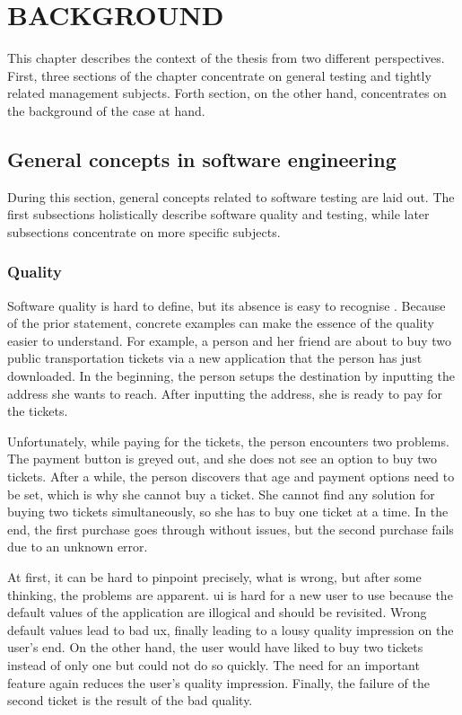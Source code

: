 \chapter{BACKGROUND}\label{chapter:background}
This chapter describes the context of the thesis from two different perspectives. First, three sections of the chapter concentrate on general testing and tightly related management subjects. Forth section, on the other hand, concentrates on the background of the case at hand.

\section{General concepts in software engineering}
During this section, general concepts related to software testing are laid out. The first subsections holistically describe software quality and testing, while later subsections concentrate on more specific subjects.

\subsection{Quality}
Software quality is hard to define, but its absence is easy to recognise \cite{kitchenham1989software,gillies2011software}. Because of the prior statement, concrete examples can make the essence of the quality easier to understand. For example, a person and her friend are about to buy two public transportation tickets via a new application that the person has just downloaded. In the beginning, the person setups the destination by inputting the address she wants to reach. After inputting the address, she is ready to pay for the tickets.

Unfortunately, while paying for the tickets, the person encounters two problems. The payment button is greyed out, and she does not see an option to buy two tickets. After a while, the person discovers that age and payment options need to be set, which is why she cannot buy a ticket. She cannot find any solution for buying two tickets simultaneously, so she has to buy one ticket at a time. In the end, the first purchase goes through without issues, but the second purchase fails due to an unknown error.

At first, it can be hard to pinpoint precisely, what is wrong, but after some thinking, the problems are apparent. \gls{ui} is hard for a new user to use because the default values of the application are illogical and should be revisited. Wrong default values lead to bad \gls{ux}, finally leading to a lousy quality impression on the user's end. On the other hand, the user would have liked to buy two tickets instead of only one but could not do so quickly. The need for an important feature again reduces the user's quality impression. Finally, the failure of the second ticket is the result of the bad quality.

